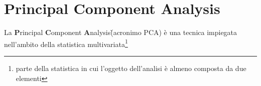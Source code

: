 \section{Principal Component Analysis}
\label{PCA}

La \textbf{P}rincipal \textbf{C}omponent \textbf{A}nalysis\` (acronimo PCA) \`e una tecnica impiegata nell'ambito della statistica multivariata\footnote{parte della statistica in cui l'oggetto dell'analisi \`e almeno composta da due elementi}
